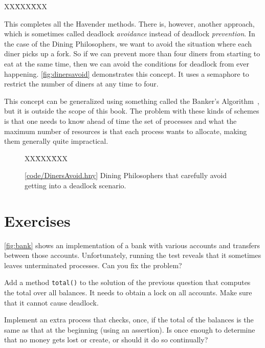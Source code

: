 \documentclass{report}
\newcommand{\harmonysource}[1]{
\begin{tabbing}
XX\=XXX\=XXX\kill
    
\end{tabbing}
}
\newcommand{\harmonylink}[1]{%
[\href{https://www.cs.cornell.edu/home/rvr/harmony/#1}{\underline{#1}}]%
}
\newenvironment{code}{
\tcolorbox
}{
\endtcolorbox
}
\begin{document}
\vspace{1em}
\begin{code}
\harmonysource{dinersfix}
\end{code}
\vspace{1em}

This completes all the Havender methods.
There is, however, another approach, which is sometimes called deadlock
\emph{avoidance}
%
instead of deadlock \emph{prevention}.
In the case of the Dining Philosophers, we want to avoid the situation where each
diner picks up a fork.  So if we can prevent more than four diners from starting to
eat at the same time, then we can avoid the conditions for deadlock from ever
happening.
\autoref{fig:dinersavoid} demonstrates this concept.  It uses a semaphore to
restrict the number of diners at any time to four.

This concept can be generalized using something called the
Banker's Algorithm~\cite{EWD108}, but it is outside the scope of this book.
The problem with these kinds of schemes is that one needs to know ahead of time
the set of processes and what the maximum number of resources is that each process
wants to allocate, making them generally quite impractical.

\begin{figure}
\begin{code}
\harmonysource{DinersAvoid}
\end{code}
\caption{\harmonylink{code/DinersAvoid.hny} Dining Philosophers that carefully avoid getting into a deadlock
scenario.}
\label{fig:dinersavoid}
\end{figure}

\section*{Exercises}
\begin{problems}
\item \label{ex:bank} \autoref{fig:bank} shows an implementation of a bank with various
accounts and transfers between those accounts.
Unfortunately, running the test reveals that it sometimes leaves unterminated
processes.  Can you fix the problem?
\item Add a method \texttt{total()} to the solution of the previous question
that computes the total over all balances.
It needs to obtain a lock on all accounts.  Make sure that
it cannot cause deadlock.
\item Implement an extra process that checks, once, if the total of
the balances is the same as that at the beginning (using an assertion).
Is once enough to determine that no money gets lost or create, or should it do
so continually?
\end{problems}
\end{document}
